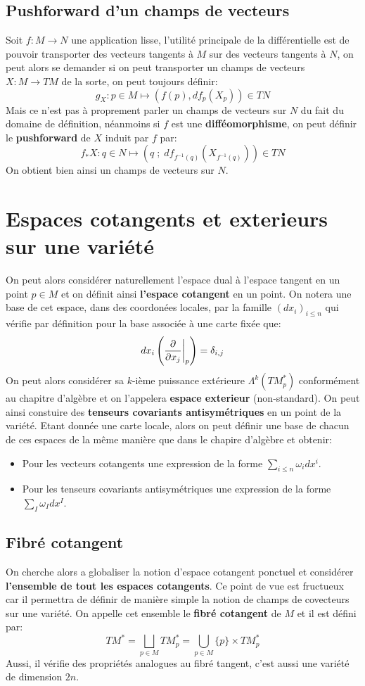    \section{Pushforward d'un champs de vecteurs}
Soit \( f : M \longrightarrow N \) une application lisse, l'utilité principale de la différentielle est de pouvoir transporter des vecteurs tangents à \( M \) sur des vecteurs tangents à \( N \), on peut alors se demander si on peut transporter un champs de vecteurs \( X : M \longrightarrow TM \) de la sorte, on peut toujours définir:
\[ 
   g_X : p \in M \longmapsto (f(p), df_p(X_p)) \in TN
\]
Mais ce n'est pas à proprement parler un champs de vecteurs sur \( N \) du fait du domaine de définition, néanmoins si \( f \) est une \textbf{difféomorphisme}, on peut définir le \textbf{pushforward} de \( X \) induit par \( f \) par:
\[ 
   f_*X : q \in N \longmapsto (q \; ; \; df_{f^{-1}(q)}(X_{f^{-1}(q)})) \in TN
\]
On obtient bien ainsi un champs de vecteurs sur \( N \).
\chapter{Espaces cotangents et exterieurs sur une variété}
   On peut alors considérer naturellement l'espace dual à l'espace tangent en un point \( p \in M \) et on définit ainsi \textbf{l'espace cotangent} en un point. On notera une base de cet espace, dans des coordonées locales, par la famille \( (dx_i)_{i \leq n} \) qui vérifie par définition pour la base associée à une carte fixée que:
   \[ 
      dx_i\left(\frac{\partial }{\partial x_j}\biggr|_p\right) = \delta_{i, j}
   \]
   On peut alors considérer sa \( k \)-ième puissance extérieure \( \Lambda^k(TM_p^*) \) conformément au chapitre d'algèbre et on l'appelera \textbf{espace exterieur} (non-standard). On peut ainsi constuire des \textbf{tenseurs covariants antisymétriques} en un point de la variété. Etant donnée une carte locale, alors on peut définir une base de chacun de ces espaces de la même manière que dans le chapire d'algèbre et obtenir:
   \begin{itemize}
      \item Pour les vecteurs cotangents une expression de la forme \( \sum_{i \leq n} \omega_idx^i \).
      \item Pour les tenseurs covariants antisymétriques une expression de la forme \( \sum_{I} \omega_Idx^I \).
   \end{itemize}
   \section{Fibré cotangent}
      On cherche alors a globaliser la notion d'espace cotangent ponctuel et considérer \textbf{l'ensemble de tout les espaces cotangents}. Ce point de vue est fructueux car il permettra de définir de manière simple la notion de champs de covecteurs sur une variété. On appelle cet ensemble le \textbf{fibré cotangent} de \( M \) et il est défini par:
      \[ 
         TM^* = \bigsqcup_{p \in M} TM^*_p = \bigcup_{p \in M} \{p\} \times TM^*_p
      \]
      Aussi, il vérifie des propriétés analogues au fibré tangent, c'est aussi une variété de dimension \( 2n \). 
